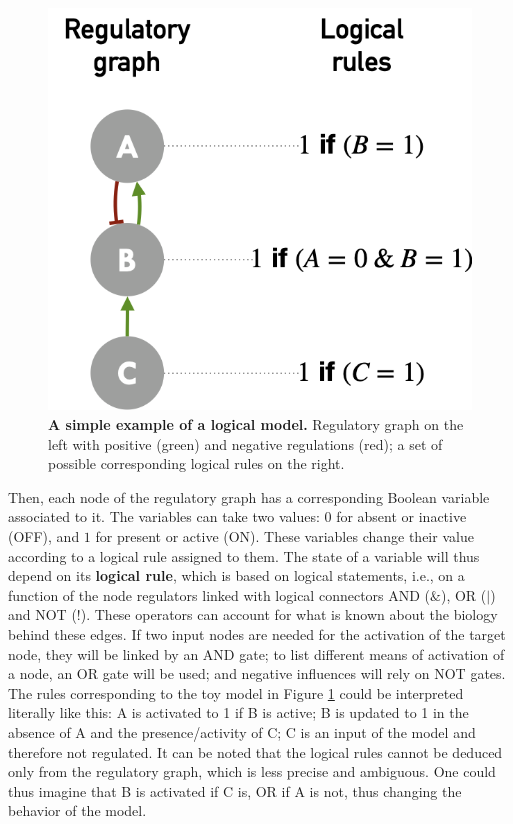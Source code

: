\documentclass[a4paper,12pt,twoside,onecolumn,openright,final,oldfontcommands]{memoir}
\begin{document}
\begin{figure}

{\centering \includegraphics[width=0.5\linewidth]{fig/logical} 

}

\caption[A simple example of a logical model]{\textbf{A simple example of a logical model.}
Regulatory graph on the left with positive (green) and negative
regulations (red); a set of possible corresponding logical rules on the
right.}\label{fig:logical}
\end{figure}






Then, each node of the regulatory graph has a corresponding Boolean
variable associated to it. The variables can take two values: \(0\) for
absent or inactive (OFF), and \(1\) for present or active (ON). These
variables change their value according to a logical rule assigned to
them. The state of a variable will thus depend on its \textbf{logical
rule}, which is based on logical statements, i.e., on a function of the
node regulators linked with logical connectors AND (\(\&\)), OR (\(|\))
and NOT (\(!\)). These operators can account for what is known about the
biology behind these edges. If two input nodes are needed for the
activation of the target node, they will be linked by an AND gate; to
list different means of activation of a node, an OR gate will be used;
and negative influences will rely on NOT gates. The rules corresponding
to the toy model in Figure \ref{fig:logical} could be interpreted
literally like this: A is activated to 1 if B is active; B is updated to
1 in the absence of A and the presence/activity of C; C is an input of
the model and therefore not regulated. It can be noted that the logical
rules cannot be deduced only from the regulatory graph, which is less
precise and ambiguous. One could thus imagine that B is activated if C
is, OR if A is not, thus changing the behavior of the model.
\end{document}
